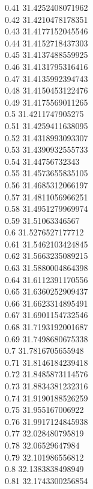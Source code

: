 {0.41	31.4252408071962\\
0.42	31.4210478178351\\
0.43	31.4177152045546\\
0.44	31.4152718437303\\
0.45	31.4137488559925\\
0.46	31.4131795316416\\
0.47	31.4135992394743\\
0.48	31.4150453122476\\
0.49	31.4175569011265\\
0.5	31.4211747905275\\
0.51	31.4259411638095\\
0.52	31.4318993093307\\
0.53	31.4390932555733\\
0.54	31.44756732343\\
0.55	31.4573655835105\\
0.56	31.4685312066197\\
0.57	31.4811056966251\\
0.58	31.4951279969974\\
0.59	31.51063346567\\
0.6	31.5276527177712\\
0.61	31.5462103424845\\
0.62	31.5663235089215\\
0.63	31.5880004864398\\
0.64	31.6112391170556\\
0.65	31.6360252909437\\
0.66	31.6623314895491\\
0.67	31.6901154732546\\
0.68	31.7193192001687\\
0.69	31.7498680675338\\
0.7	31.7816705655948\\
0.71	31.8146184239418\\
0.72	31.8485873114576\\
0.73	31.8834381232316\\
0.74	31.9190188526259\\
0.75	31.955167006922\\
0.76	31.9917124845938\\
0.77	32.028480795819\\
0.78	32.06529647984\\
0.79	32.101986556812\\
0.8	32.1383838498949\\
0.81	32.1743300256854\\
}
